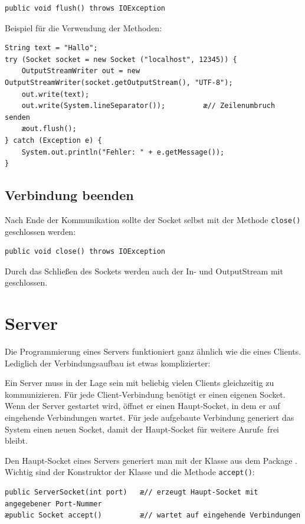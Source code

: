 \begin{lstlisting}
public void flush() throws IOException
\end{lstlisting}

Beispiel für die Verwendung der Methoden:

\begin{lstlisting}
String text = "Hallo";
try (Socket socket = new Socket ("localhost", 12345)) {
    OutputStreamWriter out = new OutputStreamWriter(socket.getOutputStream(), "UTF-8");
    out.write(text);
    out.write(System.lineSeparator());         æ// Zeilenumbruch senden
    æout.flush();
} catch (Exception e) {
    System.out.println("Fehler: " + e.getMessage());
}
\end{lstlisting}

\subsection{Verbindung beenden}

Nach Ende der Kommunikation sollte der Socket selbst mit der Methode
\lstinline|close()| geschlossen werden:

\begin{lstlisting}
public void close() throws IOException
\end{lstlisting}

Durch das Schließen des Sockets werden auch der In- und OutputStream mit
geschlossen.


\section{Server}

Die Programmierung eines Servers funktioniert ganz ähnlich wie die eines
Clients. Lediglich der Verbindungsaufbau ist etwas komplizierter:

Ein Server muss in der Lage sein mit beliebig vielen Clients gleichzeitig zu
kommunizieren. Für jede Client-Verbindung benötigt er einen eigenen Socket.
Wenn der Server gestartet wird, öffnet er einen Haupt-Socket, in dem er auf
eingehende Verbindungen wartet. Für jede aufgebaute Verbindung generiert das
System einen neuen Socket, damit der Haupt-Socket für weitere \glqq Anrufe\grqq\
frei bleibt.

Den Haupt-Socket eines Servers generiert man mit der Klasse
 aus dem Package . Wichtig sind der
Konstruktor der Klasse und die Methode \lstinline|accept()|:

\begin{lstlisting}
public ServerSocket(int port)   æ// erzeugt Haupt-Socket mit angegebener Port-Nummer 
æpublic Socket accept()	        æ// wartet auf eingehende Verbindungen
\end{lstlisting}

